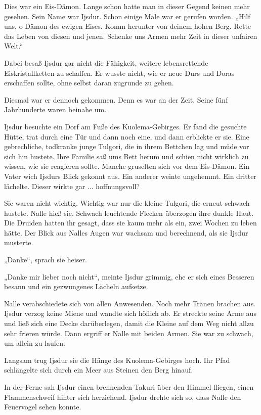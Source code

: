 Dies war ein Eis-Dämon. Lange schon hatte man in dieser Gegend keinen mehr gesehen. Sein Name war Ijsdur. Schon einige Male war er gerufen worden. „Hilf uns, o Dämon des ewigen Eises. Komm herunter von deinem hohen Berg. Rette das Leben von diesen und jenen. Schenke uns Armen mehr Zeit in dieser unfairen Welt.“

Dabei besaß Ijsdur gar nicht die Fähigkeit, weitere lebensrettende Eiskristallketten zu schaffen. Er wusste nicht, wie er neue Durs und Doras erschaffen sollte, ohne selbst daran zugrunde zu gehen.

Diesmal war er dennoch gekommen. Denn es war an der Zeit. Seine fünf Jahrhunderte waren beinahe um.

Ijsdur besuchte ein Dorf am Fuße des Kuolema-Gebirges. Er fand die gesuchte Hütte, trat durch eine Tür und dann noch eine, und dann erblickte er sie. Eine gebrechliche, todkranke junge Tulgori, die in ihrem Bettchen lag und müde vor sich hin hustete. Ihre Familie saß ums Bett herum und schien nicht wirklich zu wissen, wie sie reagieren sollte. Manche gruselten sich vor dem Eis-Dämon. Ein Vater wich Ijsdurs Blick gekonnt aus. Ein anderer weinte ungehemmt. Ein dritter lächelte. Dieser wirkte gar ... hoffnungsvoll?

Sie waren nicht wichtig. Wichtig war nur die kleine Tulgori, die erneut schwach hustete. Nalle hieß sie. Schwach leuchtende Flecken überzogen ihre dunkle Haut. Die Druiden hatten ihr gesagt, dass sie kaum mehr als ein, zwei Wochen zu leben hätte. Der Blick aus Nalles Augen war wachsam und berechnend, als sie Ijsdur musterte.

„Danke“, sprach sie heiser.

„Danke mir lieber noch nicht“, meinte Ijsdur grimmig, ehe er sich eines Besseren besann und ein gezwungenes Lächeln aufsetze.

Nalle verabschiedete sich von allen Anwesenden. Noch mehr Tränen brachen aus. Ijsdur verzog keine Miene und wandte sich höflich ab. Er streckte seine Arme aus und ließ sich eine Decke darüberlegen, damit die Kleine auf dem Weg nicht allzu sehr frieren würde. Dann ergriff er Nalle mit beiden Armen. Sie war zu schwach, um allein zu laufen.

Langsam trug Ijsdur sie die Hänge des Kuolema-Gebirges hoch. Ihr Pfad schlängelte sich durch ein Meer aus Steinen den Berg hinauf.

In der Ferne sah Ijsdur einen brennenden Takuri über den Himmel fliegen, einen Flammenschweif hinter sich herziehend. Ijsdur drehte sich so, dass Nalle den Feuervogel sehen konnte.

